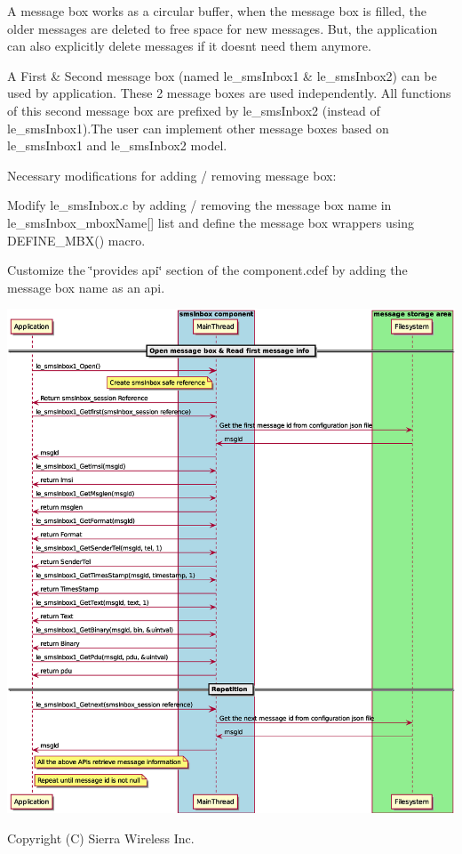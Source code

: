 A message box works as a circular buffer, when the message box is filled, the older messages are deleted to free space for new messages. But, the application can also explicitly delete messages if it doesn\textquotesingle{}t need them anymore.

A First \& Second message box (named le\+\_\+sms\+Inbox1 \& le\+\_\+sms\+Inbox2) can be used by application. These 2 message boxes are used independently. All functions of this second message box are prefixed by le\+\_\+sms\+Inbox2 (instead of le\+\_\+sms\+Inbox1).The user can implement other message boxes based on le\+\_\+sms\+Inbox1 and le\+\_\+sms\+Inbox2 model.

Necessary modifications for adding / removing message box\+:


\begin{DoxyItemize}
\item Modify le\+\_\+sms\+Inbox.\+c by adding / removing the message box name in le\+\_\+sms\+Inbox\+\_\+mbox\+Name\mbox{[}\mbox{]} list and define the message box wrappers using D\+E\+F\+I\+N\+E\+\_\+\+M\+B\+X() macro.
\item Customize the \char`\"{}provides api\char`\"{} section of the component.\+cdef by adding the message box name as an api.
\end{DoxyItemize}


\begin{DoxyImageNoCaption}
  \mbox{\includegraphics[width=\textwidth,height=\textheight/2,keepaspectratio=true]{le_smsInbox_GetMessage}}
\end{DoxyImageNoCaption}
 Copyright (C) Sierra Wireless Inc. 